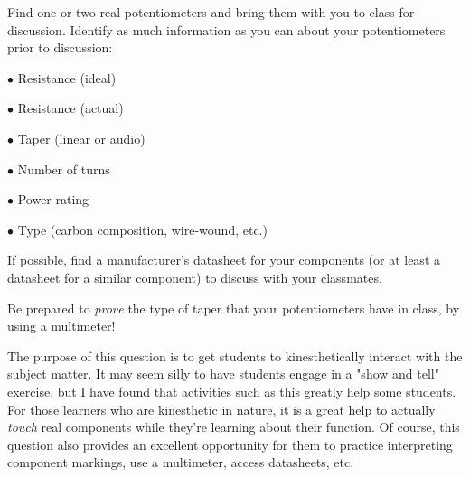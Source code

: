 

Find one or two real potentiometers and bring them with you to class for discussion.  Identify as much information as you can about your potentiometers prior to discussion:

\medskip
\item{$\bullet$} Resistance (ideal)
\item{$\bullet$} Resistance (actual)
\item{$\bullet$} Taper (linear or audio)
\item{$\bullet$} Number of turns
\item{$\bullet$} Power rating
\item{$\bullet$} Type (carbon composition, wire-wound, etc.)
\medskip







If possible, find a manufacturer's datasheet for your components (or at least a datasheet for a similar component) to discuss with your classmates.

Be prepared to {\it prove} the type of taper that your potentiometers have in class, by using a multimeter!







The purpose of this question is to get students to kinesthetically interact with the subject matter.  It may seem silly to have students engage in a "show and tell" exercise, but I have found that activities such as this greatly help some students.  For those learners who are kinesthetic in nature, it is a great help to actually {\it touch} real components while they're learning about their function.  Of course, this question also provides an excellent opportunity for them to practice interpreting component markings, use a multimeter, access datasheets, etc.




